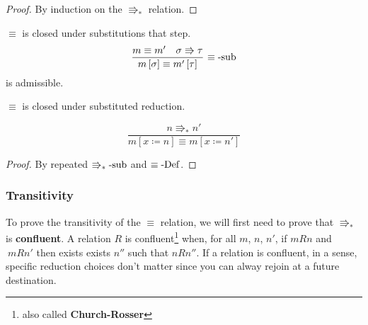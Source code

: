 \begin{proof}
By induction on the $\Rrightarrow_{\ast}$ relation.
\end{proof}
\begin{lem}
$\equiv$ is closed under substitutions that step.
\[
\frac{m\equiv m'\quad\sigma\Rrightarrow\tau}{m\left[\sigma\right]\equiv m'\left[\tau\right]}\,\operatorname{\equiv-sub}
\]
is admissible.
\end{lem}
 
\begin{cor}
$\equiv$ is closed under substituted reduction.
\end{cor}
 
\[
\frac{n\Rrightarrow_{\ast}n'}{m\left[x\coloneqq n\right]\equiv m\left[x\coloneqq n'\right]}
\]
 
\begin{proof}
By repeated $\operatorname{\Rrightarrow_{\ast}-sub}$ and $\equiv\operatorname{-Def}$.
\end{proof}
 
\subsubsection{Transitivity}
 
To prove the transitivity of the $\equiv$ relation, we will first need to prove that \textbf{$\Rrightarrow_{\ast}$ }is \textbf{confluent}.
A relation $R$ is confluent\footnote{also called \textbf{Church-Rosser}} when, for all $m$, $n$, $n'$, if $mRn$ and $\:mRn'$ then exists exists $n''$ such that $nRn''$. %
If a relation is confluent, in a sense, specific reduction choices don't matter since you can alway rejoin at a future destination.
 
